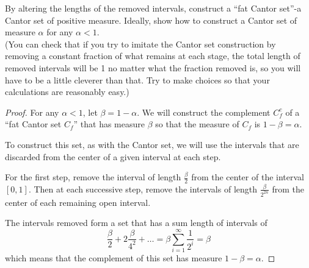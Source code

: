 \begin{pblm}%
	By altering the lengths of the removed intervals, construct a ``fat Cantor set''-a 
	Cantor set of positive measure. Ideally, show how to construct a Cantor set of 
	measure $\alpha$ for any $\alpha < 1$. \\
	(You can check that if you try to imitate the Cantor set construction by 
	removing a constant fraction of what remains at each stage, the total length of 
	removed intervals will be 1 no matter what the fraction removed is, so you will 
	have to be a little cleverer than that. Try to make choices so that your 
	calculations are reasonably easy.)

\begin{proof}
	For any $\alpha < 1$, let $\beta = 1 - \alpha$. We will construct the 
	complement $C_f^c$ of a ``fat Cantor set $C_f$'' that has measure $\beta$ 
	so that the measure of $C_f$ is $1 - \beta = \alpha$. 

	To construct this set, as with the Cantor set, we will use the intervals 
	that are discarded from the center of a given interval at each step. 

	For the first step, remove the interval of length $\frac{\beta}{2}$ from 
	the center of the interval $[0,1]$. Then at each successive step, remove the 
	intervals of length $\frac{\beta}{2^{2n}}$ from the center of each remaining 
	open interval. 

	\begin{center}
	\end{center}
	The intervals removed form a set that has a sum length of intervals of 
	\begin{equation*}
		\frac{\beta}{2} + 2\frac{\beta}{4^2} + \dots = \beta\sum\limits_{i=1}^\infty \frac{1}{2^i} = \beta
	\end{equation*}
	which means that the complement of this set has measure $1 - \beta = \alpha$. 
\end{proof}
\end{pblm}

